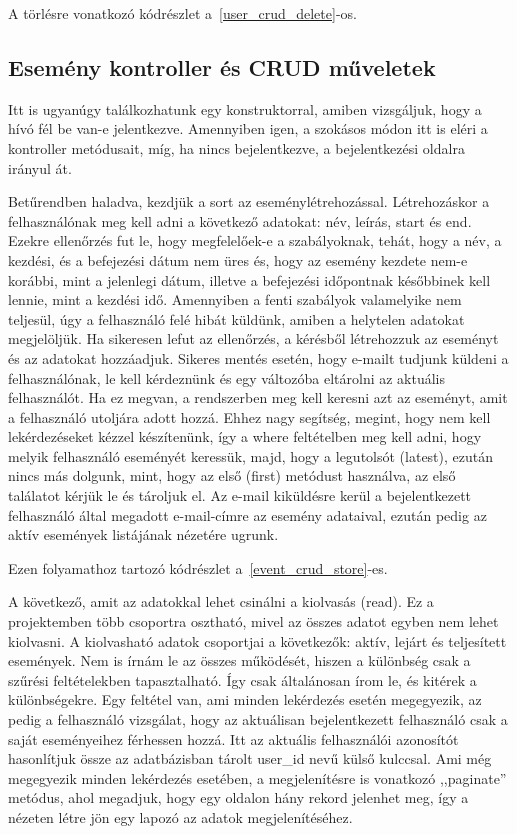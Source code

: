 \documentclass[
]{thesis-ekf}
\theoremstyle{definition}
\theoremstyle{remark}
\begin{document}
	A törlésre vonatkozó kódrészlet a~\ref{user_crud_delete}-os.
	
	
	
	\subsection{Esemény kontroller és CRUD műveletek}
	Itt is ugyanúgy találkozhatunk egy konstruktorral, amiben vizsgáljuk, hogy a hívó fél be van-e jelentkezve. Amennyiben igen, a szokásos módon itt is eléri a kontroller metódusait, míg, ha nincs bejelentkezve, a bejelentkezési oldalra irányul át.
	
	Betűrendben haladva, kezdjük a sort az eseménylétrehozással. Létrehozáskor a felhasználónak meg kell adni a következő adatokat: név, leírás, start és end. Ezekre ellenőrzés fut le, hogy megfelelőek-e a szabályoknak, tehát, hogy a név, a kezdési, és a befejezési dátum nem üres és, hogy az esemény kezdete nem-e korábbi, mint a jelenlegi dátum, illetve a befejezési időpontnak későbbinek kell lennie, mint a kezdési idő. Amennyiben a fenti szabályok valamelyike nem teljesül, úgy a felhasználó felé hibát küldünk, amiben a helytelen adatokat megjelöljük. Ha sikeresen lefut az ellenőrzés, a kérésből létrehozzuk az eseményt és az adatokat hozzáadjuk. Sikeres mentés esetén, hogy e-mailt tudjunk küldeni a felhasználónak, le kell kérdeznünk és egy változóba eltárolni az aktuális felhasználót. Ha ez megvan, a rendszerben meg kell keresni azt az eseményt, amit a felhasználó utoljára adott hozzá. Ehhez nagy segítség, megint, hogy nem kell lekérdezéseket kézzel készítenünk, így a where feltételben meg kell adni, hogy melyik felhasználó eseményét keressük, majd, hogy a legutolsót (latest), ezután nincs más dolgunk, mint, hogy az első (first) metódust használva, az első találatot kérjük le és tároljuk el. Az e-mail kiküldésre kerül a bejelentkezett felhasználó által megadott e-mail-címre az esemény adataival, ezután pedig az aktív események listájának nézetére ugrunk.
	
	Ezen folyamathoz tartozó kódrészlet a~\ref{event_crud_store}-es.
	
	
	
	A következő, amit az adatokkal lehet csinálni a kiolvasás (read). Ez a projektemben több csoportra osztható, mivel az összes adatot egyben nem lehet kiolvasni. A kiolvasható adatok csoportjai a következők: aktív, lejárt és teljesített események. Nem is írnám le az összes működését, hiszen a különbség csak a szűrési feltételekben tapasztalható. Így csak általánosan írom le, és kitérek a különbségekre. Egy feltétel van, ami minden lekérdezés esetén megegyezik, az pedig a felhasználó vizsgálat, hogy az aktuálisan bejelentkezett felhasználó csak a saját eseményeihez férhessen hozzá. Itt az aktuális felhasználói azonosítót hasonlítjuk össze az adatbázisban tárolt user\_id nevű külső kulccsal. Ami még megegyezik minden lekérdezés esetében, a megjelenítésre is vonatkozó ,,paginate'' metódus, ahol megadjuk, hogy egy oldalon hány rekord jelenhet meg, így a nézeten létre jön egy lapozó az adatok megjelenítéséhez.
	
\end{document}
